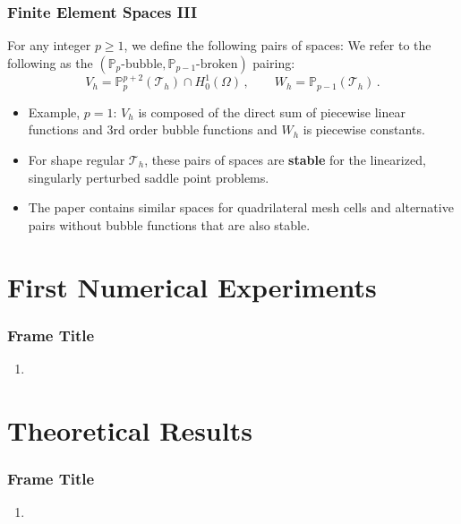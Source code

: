\documentclass[aspectratio=169,xcolor=dvipsnames,11pt]{beamer}
\begin{document}
\begin{frame}\frametitle{Finite Element Spaces III}
For any integer $p \geq 1$, we define the following pairs of spaces:
\label{eq:SubspacePairs}
\smallskip
We refer to the following as the $(\mathbb{P}_p\text{-bubble},\mathbb{P}_{p-1}\text{-broken})$ pairing:
\begin{equation*}
\label{eq:SubspacePair1}
	V_h = \mathbb{P}_{p}^{p+2}(\mathcal{T}_h)\cap H^1_0(\Omega)
	\,,\qquad
	W_h = \mathbb{P}_{p-1}(\mathcal{T}_h)
	\,.
\end{equation*}
%
\vspace{-3ex}
\begin{itemize}
\item Example, $p = 1$: $V_h$ is composed of the direct sum of piecewise linear functions and 3rd order bubble functions and $W_h$ is piecewise constants. \pause
\item
For shape regular $\mathcal{T}_h$, these pairs of spaces are \textbf{stable} for the linearized, singularly perturbed saddle point problems.
\item 
The paper contains similar spaces for quadrilateral mesh cells and alternative pairs without bubble functions that are also stable.
\end{itemize}
\end{frame}

 
 \section{First Numerical Experiments}
 \begin{frame}\frametitle{Frame Title}
        \begin{enumerate}
    	\item
    \end{enumerate}
 \end{frame}
 
  \section{Theoretical Results}
 \begin{frame}\frametitle{Frame Title}
        \begin{enumerate}
    	\item
    \end{enumerate}
 \end{frame}
\end{document}
